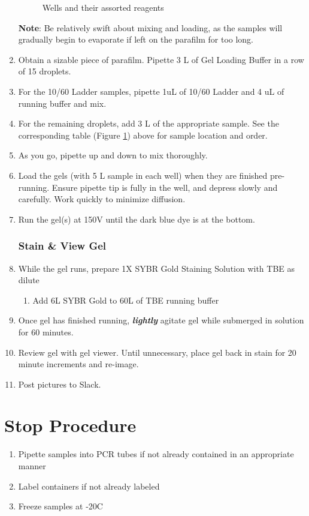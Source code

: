 \documentclass[letterpaper]{article}
\newcommand{\C}{\degree{}C}
\newcommand{\uL}{\micro{}L}
\begin{document}
\begin{enumerate}
\begin{figure}[ht]
\begin{center}
\begin{tabular}{|l|l|}
\end{tabular}
\label{tab:Gel Layout} %
\caption{Wells and their assorted reagents} %
\end{center}
\end{figure}
\textbf{Note}: Be relatively swift about mixing and loading, as the samples will gradually begin to evaporate if left on the parafilm for too long.
\item{Obtain a sizable piece of parafilm. Pipette 3 \uL{} of Gel Loading Buffer in a row of 15 droplets.}
\item{For the 10/60 Ladder samples, pipette 1uL of 10/60 Ladder and 4 uL of running buffer and mix.}
\item{For the remaining droplets, add 3 \uL{} of the appropriate sample. See the corresponding table (Figure \ref{tab:Gel Layout}) above for sample location and order.}
\item{As you go, pipette up and down to mix thoroughly.}
\item{Load the gels (with 5 \uL{} sample in each well) when they are finished pre-running. Ensure pipette tip is fully in the well, and depress slowly and carefully. Work quickly to minimize diffusion.}
\item{Run the gel(s) at 150V until the dark blue dye is at the bottom.}

\subsubsection{Stain \& View Gel}
\item{While the gel runs, prepare 1X SYBR Gold Staining Solution with TBE as dilute}
	\begin{enumerate}
		\item{Add 6\uL{} SYBR Gold to 60\uL{} of TBE running buffer}
	\end{enumerate}
\item{Once gel has finished running, \textbf{\textit{lightly}} agitate gel while submerged in solution for 60 minutes.}
\item{Review gel with gel viewer. Until unnecessary, place gel back in stain for 20 minute increments and re-image.}
\item{Post pictures to Slack.}\\
\end{enumerate} 

\section*{Stop Procedure}
\begin{enumerate}
\item{Pipette samples into PCR tubes if not already contained in an appropriate manner}
\item{Label containers if not already labeled}
\item{Freeze samples at -20\C{}}
\end{enumerate}



\end{document}
